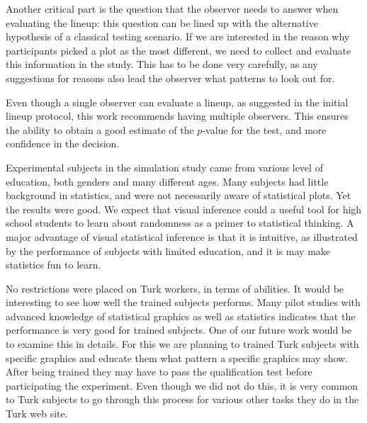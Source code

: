 \documentclass{article}
\newcommand{\blue}[1]{{\color{blue} #1}} %
\begin{document}
\blue{Another critical part is the  question that the observer needs to answer when evaluating the lineup: this question can be lined up with the alternative hypothesis of a classical testing scenario. 
If we are interested in the reason why participants picked a plot as the most different, we need to collect and evaluate this information in the study. This has to be done very carefully, as any suggestions for reasons also lead the observer  what patterns to look out for.}

Even though a single observer can evaluate a lineup, as suggested in the initial lineup protocol, this work recommends having multiple observers. This ensures the ability to obtain a good estimate of the $p$-value for the test, and more confidence in the decision.

Experimental subjects in the simulation study came from various level of education, both genders and many different ages. Many subjects had little background in statistics, and were not necessarily aware of statistical plots. Yet the results were good. We expect that visual inference could a useful tool for high school students to learn about randomness as a primer to statistical thinking. A major advantage of visual statistical inference is that it is intuitive, as illustrated by the performance of subjects with limited education, and it is may make statistics fun to learn. 

No restrictions were placed on Turk workers, in terms of abilities. It would be interesting to see how well the trained subjects performs. Many pilot studies with advanced knowledge of statistical graphics as well as statistics indicates that the performance is very good for trained subjects. One of our future work would be to examine this in details. For this we are planning to trained Turk subjects with specific graphics and educate them what pattern a specific graphics may show. After being trained they may have to pass the qualification test before participating the experiment. Even though we did not do this, it is very common to Turk subjects to go through this process for various other tasks they do in the Turk web site.

\end{document}
